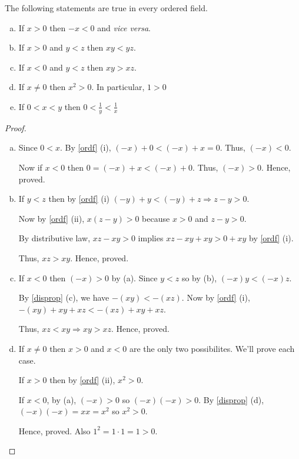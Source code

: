 \begin{prop}
	\label{ordfprop}
	The following statements are true in every ordered field.
	\begin{enumerate}[a)]
		\item If $x > 0$ then $ -x < 0$ and {\it vice versa}.
		\item If $x > 0$ and $y < z$ then $xy < yz$.
		\item If $x < 0$ and $y < z$ then $xy > xz$.
		\item If $x \neq 0$ then $x^2 > 0$. In particular, $1 > 0$
		\item If $0 < x < y$ then $0 < \frac{1}{y} < \frac{1}{x} $
	\end{enumerate}
\end{prop}

\begin{proof}
	\begin{enumerate}[a)]
		\item Since $0 < x$. By \ref{ordf} (i), $(-x) + 0 < (-x) + x = 0$. Thus, $(-x) < 0$.

		Now if $x < 0$ then $0 = (-x) + x < (-x) + 0$. Thus, $(-x) > 0$.
		Hence, proved.

		\item If $y < z$ then by \ref{ordf} (i) $(-y) + y < (-y) + z \Rightarrow z - y > 0$.

		Now by \ref{ordf} (ii), $x(z - y) > 0$ because $x > 0$ and $z - y > 0$.

		By distributive law, $xz - xy > 0$ implies $xz - xy + xy > 0 + xy$ by \ref{ordf} (i).

		Thus, $xz > xy$. Hence, proved.

		\item If $x < 0$ then $(-x) > 0$ by (a).
		Since $y < z$ so by (b), $(-x)y < (-x)z$.

		By \ref{disprop} (c), we have $-(xy) < -(xz)$.
		Now by \ref{ordf} (i), $-(xy) + xy + xz < -(xz) + xy + xz$.

		Thus, $xz < xy \Rightarrow xy > xz$. Hence, proved.

		\item If $x \neq 0$ then $x > 0$ and $x < 0$ are the only two possibilites.
		We'll prove each case.

		If $x > 0$ then by \ref{ordf} (ii), $x^2 > 0$.

		If $x < 0$, by (a), $(-x) > 0$ so $(-x)(-x) > 0$.
		By \ref{disprop} (d), $(-x)(-x) = xx = x^2$ so $x^2 > 0$.

		Hence, proved. Also $1^2 = 1 \cdot 1 = 1 > 0$.


\end{enumerate}
\end{proof}
